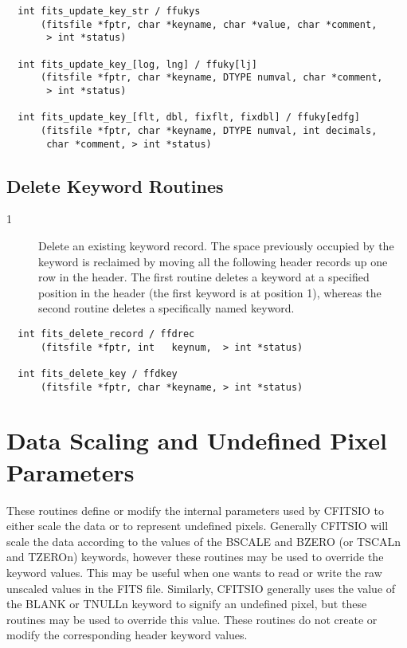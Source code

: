 \begin{verbatim}
  int fits_update_key_str / ffukys
      (fitsfile *fptr, char *keyname, char *value, char *comment,
       > int *status)

  int fits_update_key_[log, lng] / ffuky[lj]
      (fitsfile *fptr, char *keyname, DTYPE numval, char *comment,
       > int *status)

  int fits_update_key_[flt, dbl, fixflt, fixdbl] / ffuky[edfg]
      (fitsfile *fptr, char *keyname, DTYPE numval, int decimals,
       char *comment, > int *status)
\end{verbatim}

\subsection{ Delete Keyword Routines \label{FFDREC}}


\begin{description}
\item[1 ] Delete an existing keyword record.  The space previously occupied by
    the keyword is reclaimed by moving all the following header records up
    one row in the header.  The first routine deletes a keyword at a
    specified position in the header (the first keyword is at position 1),
   whereas the second routine deletes a specifically named keyword.
\end{description}

\begin{verbatim}
  int fits_delete_record / ffdrec
      (fitsfile *fptr, int   keynum,  > int *status)

  int fits_delete_key / ffdkey
      (fitsfile *fptr, char *keyname, > int *status)
\end{verbatim}


\section{Data Scaling and Undefined Pixel Parameters  \label{FFPSCL}}

These routines define or modify the internal parameters used by
CFITSIO to either scale the data or to represent undefined pixels.
Generally CFITSIO will scale the data according to the values of the BSCALE
and BZERO (or TSCALn and TZEROn) keywords, however these routines
may be used to override the keyword values.  This may be useful when
one wants to read or write the raw unscaled values in the FITS file.
Similarly, CFITSIO generally uses the value of the BLANK or TNULLn
keyword to signify an undefined pixel, but these routines may be used
to override this value.  These routines do not create or modify the
corresponding header keyword values.


